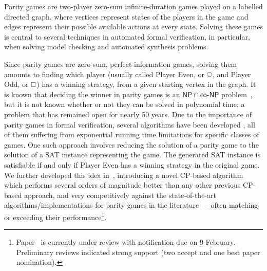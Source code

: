 \documentclass[runningheads]{llncs}
\begin{document}
Parity games are two-player zero-sum infinite-duration games played on a labelled directed graph, where vertices represent states of the players in the game and edges represent their possible available actions at every state. 
Solving these games is central to several techniques in automated formal verification, in particular, when solving model checking and automated synthesis problems.

Since parity games are zero-sum, perfect-information games, solving them amounts to finding which player (usually called Player Even, or $\even$, and Player Odd, or $\odd$) has a winning strategy, from a given starting vertex in the graph. 
It is known that deciding the winner in parity games is an $\mathsf{NP} \cap \mathsf{co\textit{-}NP}$ problem~\cite{Jurdziński:1998}, but it is not known whether or not they can be solved in polynomial time; a problem that has remained open for nearly 50 years. 
Due to the importance of parity games in formal verification, several algorithms have been developed \cite{Aggarwal:2023,Benerecetti:2025,Jurdziński:2000,Jurdziński:2022,Zielonka:1998}, all of them suffering from exponential running time limitations for specific classes of games. 
One such approach involves reducing the solution of a parity game to the solution of a SAT instance representing the game. The generated SAT instance is satisfiable if and only if Player Even has a winning strategy in the original game. 
We further developed this idea in~\cite{Hernandez:2026:noc}, introducing a novel CP-based algorithm which performs several orders of magnitude better than any other previous CP-based approach, and very competitively against the state-of-the-art algorithms/implementations for parity games in the literature~\cite{vanDijk:2018,Benerecetti:2025,Aggarwal:2023} -- often matching or exceeding their performance\footnote{
Paper~\cite{Hernandez:2026:noc} is currently under review with notification due on 9 February. Preliminary reviews indicated strong support (two accept and one best paper nomination).
}. 
\end{document}
